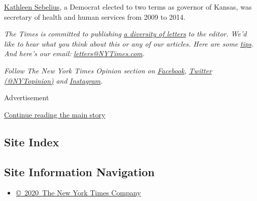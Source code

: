 \href{http://www.sebeliusresources.com/welcome-1}{Kathleen Sebelius}, a
Democrat elected to two terms as governor of Kansas, was secretary of
health and human services from 2009 to 2014.

\emph{The Times is committed to publishing}
\href{https://www.nytimes3xbfgragh.onion/2019/01/31/opinion/letters/letters-to-editor-new-york-times-women.html}{\emph{a
diversity of letters}} \emph{to the editor. We'd like to hear what you
think about this or any of our articles. Here are some}
\href{https://help.nytimes3xbfgragh.onion/hc/en-us/articles/115014925288-How-to-submit-a-letter-to-the-editor}{\emph{tips}}\emph{.
And here's our email:}
\href{mailto:letters@NYTimes.com}{\emph{letters@NYTimes.com}}\emph{.}

\emph{Follow The New York Times Opinion section on}
\href{https://www.facebookcorewwwi.onion/nytopinion}{\emph{Facebook}}\emph{,}
\href{http://twitter.com/NYTOpinion}{\emph{Twitter (@NYTopinion)}}
\emph{and}
\href{https://www.instagram.com/nytopinion/}{\emph{Instagram}}\emph{.}

Advertisement

\protect\hyperlink{after-bottom}{Continue reading the main story}

\hypertarget{site-index}{%
\subsection{Site Index}\label{site-index}}

\hypertarget{site-information-navigation}{%
\subsection{Site Information
Navigation}\label{site-information-navigation}}

\begin{itemize}
\tightlist
\item
  \href{https://help.nytimes3xbfgragh.onion/hc/en-us/articles/115014792127-Copyright-notice}{©~2020~The
  New York Times Company}
\end{itemize}

